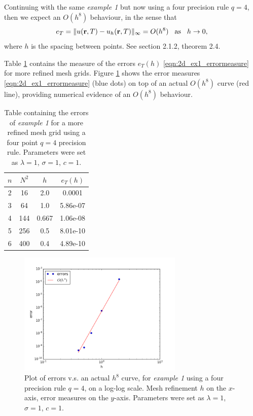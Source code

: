 \documentclass{uonmathreport}
\begin{document}
Continuing with the same \textit{example 1} but now using a four precision rule $q=4$, then we expect an $O(h^8)$ behaviour, in the sense that
\begin{equation}\label{eqn:2d_test1_escrom}
e_T = \| u(\mathbf{r}, T) - u_h(\mathbf{r}, T)\|_{\infty} = O(h^8)
\hspace{3mm} \textnormal{as}\hspace{3mm} h \rightarrow 0,
\end{equation}
where $h$ is the spacing between points. See \cite{lima2015numerical} section 2.1.2, theorem 2.4.

Table \ref{table:2dErrors_test1_q4} contains the measure of the errors $e_T(h)$ \ref{eqn:2d_ex1_errormeasure} for more refined mesh grids. Figure \ref{fig:2dErrors_test1_q4} shows the error measures \ref{eqn:2d_ex1_errormeasure} (blue dots) on top of an actual $O(h^8)$ curve (red line), providing numerical evidence of an $O(h^8)$ behaviour.

\begin{table}[H]
	\centering
	\begin{tabular}{|c|c|c|c|}
		\hline
		$n$&$N^2$&$h$&$e_T(h)$\\
		\hline
		2&16&2.0&0.0001\\
		3&64&1.0&5.86e-07\\
		4&144&0.667&1.06e-08\\
		5&256&0.5&8.01e-10\\
		6&400&0.4&4.89e-10\\
		\hline
	\end{tabular}
	\caption{Table containing the errors of \textit{example 1} for a more refined mesh grid using a four point $q=4$ precision rule. Parameters were set as $\lambda=1$, $\sigma=1$, $c=1$.}
	\label{table:2dErrors_test1_q4}
\end{table}

\begin{figure}[H]
	\begin{center}
		\includegraphics[width=0.7\textwidth]{Figures/2dRectTest1_q=4.png}
	\end{center}
	\caption{Plot of errors v.s. an actual $h^8$ curve, for \textit{example 1} using a four precision rule $q=4$, on a log-log scale. Mesh refinement $h$ on the $x$-axis, error measures on the $y$-axis. Parameters were set as $\lambda=1$, $\sigma=1$, $c=1$.}
	\label{fig:2dErrors_test1_q4}
\end{figure}
\end{document}
